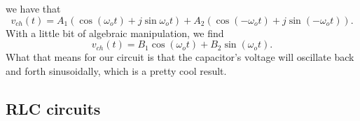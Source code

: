 \documentclass[nobib]{tufte-handout}
\begin{document}
we have that 
\begin{equation}
    v_{ch}(t) = A_1 \left(\cos{(\omega_ot)} + j\sin{\omega_ot}\right)
    + A_2 \left(\cos{(-\omega_ot)} + j\sin{(-\omega_ot)}\right).
\end{equation}
With a little bit of 
algebraic manipulation, we find 
\begin{equation}
    v_{ch}(t) = B_1\cos{(\omega_ot)} + B_2 \sin{(\omega_ot)}.
\end{equation}
What that means for our circuit 
is that the capacitor's voltage will 
oscillate back and forth sinusoidally, 
which is a pretty cool result. 

\subsection{RLC circuits}
\end{document}
